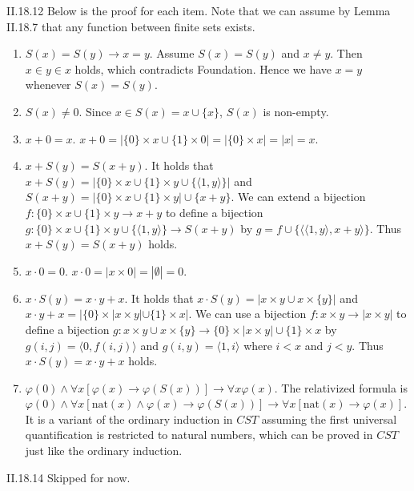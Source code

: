 \documentclass[12pt]{article}
\begin{document}
\begin{customthm}{II.18.12}
  Below is the proof for each item. Note that we can assume by Lemma II.18.7 that any function between finite sets exists.
  \begin{enumerate}[label=\alph*.]
    \item\underline{$S(x)=S(y)\rightarrow x=y$}. Assume $S(x)=S(y)$ and $x\neq y$. Then $x\in y\in x$ holds, which contradicts Foundation. Hence we have $x=y$ whenever $S(x)=S(y)$.
    \item\underline{$S(x)\neq 0$}. Since $x\in S(x)=x\cup\{x\}$, $S(x)$ is non-empty.
    \item\underline{$x+0=x$}. $x+0=|\{0\}\times x\cup\{1\}\times0|=|\{0\}\times x|=|x|=x$.
    \item\underline{$x+S(y)=S(x+y)$}. It holds that $x+S(y)=|\{0\}\times x\cup\{1\}\times y\cup\{\langle1,y\rangle\}|$ and $S(x+y)=|\{0\}\times x\cup\{1\}\times y|\cup\{x+y\}$. We can extend a bijection $f:\{0\}\times x\cup\{1\}\times y\rightarrow x+y$ to define a bijection $g:\{0\}\times x\cup\{1\}\times y\cup\{\langle1,y\rangle\}\rightarrow S(x+y)$ by $g=f\cup\{\langle\langle1,y\rangle,x+y\rangle\}$. Thus $x+S(y)=S(x+y)$ holds.
    \item\underline{$x\cdot 0=0$}. $x\cdot 0=|x\times 0|=|\emptyset|=0$.
    \item\underline{$x\cdot S(y)=x\cdot y+x$}. It holds that $x\cdot S(y)=|x\times y\cup x\times\{y\}|$ and $x\cdot y+x=|\{0\}\times|x\times y|\cup\{1\}\times x|$. We can use a bijection $f:x\times y\rightarrow|x\times y|$ to define a bijection $g:x\times y\cup x\times\{y\}\rightarrow\{0\}\times|x\times y|\cup\{1\}\times x$ by $g(i,j)=\langle0,f(i,j)\rangle$ and $g(i,y)=\langle1,i\rangle$ where $i<x$ and $j<y$. Thus $x\cdot S(y)=x\cdot y+x$ holds.
    \item\underline{$\varphi(0)\wedge\forall x[\varphi(x)\rightarrow\varphi(S(x))]\rightarrow\forall x\varphi(x)$}. The relativized formula is $\varphi(0)\wedge\forall x[\mathrm{nat}(x)\wedge\varphi(x)\rightarrow\varphi(S(x))]\rightarrow\forall x[\mathrm{nat}(x)\rightarrow\varphi(x)]$. It is a variant of the ordinary induction in $CST$ assuming the first universal quantification is restricted to natural numbers, which can be proved in $CST$ just like the ordinary induction.
  \end{enumerate}
\end{customthm}

\begin{customthm}{II.18.14}
  Skipped for now.
\end{customthm}
\end{document}
